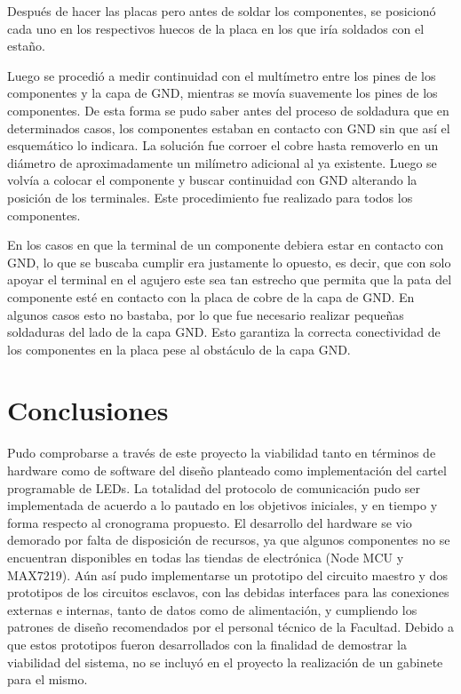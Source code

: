 Después de hacer las placas pero antes de soldar los componentes, se posicionó cada uno en los respectivos huecos de la placa en los que iría soldados con el estaño.

Luego se procedió a medir continuidad con el multímetro entre los pines de los componentes y la capa de GND, mientras se movía suavemente los pines de los componentes. De esta forma se pudo saber antes del proceso de soldadura que en determinados casos, los componentes estaban en contacto con GND sin que así el esquemático lo indicara. La solución fue corroer el cobre hasta removerlo en un diámetro de aproximadamente un milímetro adicional al ya existente. Luego se volvía a colocar el componente y buscar continuidad con GND alterando la posición de los terminales. Este procedimiento fue realizado para todos los componentes.

En los casos en que la terminal de un componente debiera estar en contacto con GND, lo que se buscaba cumplir era justamente lo opuesto, es decir, que con solo apoyar el terminal en el agujero este sea tan estrecho que permita que la pata del componente esté en contacto con la placa de cobre de la capa de GND. En algunos casos esto no bastaba, por lo que fue necesario realizar pequeñas soldaduras del lado de la capa GND. Esto garantiza la correcta conectividad de los componentes en la placa pese al obstáculo de la capa GND.


\section{Conclusiones}

Pudo comprobarse a través de este proyecto la viabilidad tanto en términos de hardware como de software del diseño planteado como implementación del cartel programable de LEDs. 
La totalidad del protocolo de comunicación pudo ser implementada de acuerdo a lo pautado en los objetivos iniciales, y en tiempo y forma respecto al cronograma propuesto. El desarrollo del hardware se vio demorado por falta de disposición de recursos, ya que algunos componentes no se encuentran disponibles en todas las tiendas de electrónica (Node MCU y MAX7219). Aún así pudo implementarse un prototipo del circuito maestro y dos prototipos de los circuitos esclavos, con las debidas interfaces para las conexiones externas e internas, tanto de datos como de alimentación, y cumpliendo los patrones de diseño recomendados por el personal técnico de la Facultad. Debido a que estos prototipos fueron desarrollados con la finalidad de demostrar la viabilidad del sistema, no se incluyó en el proyecto la realización de un gabinete para el mismo.

